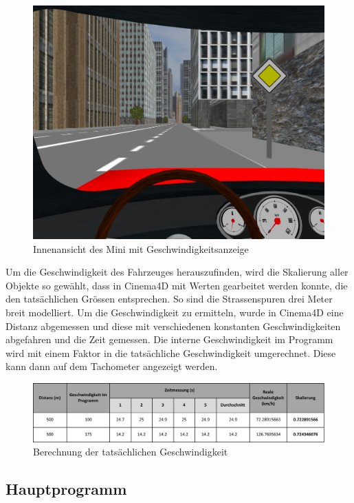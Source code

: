 \begin{figure}[H]
\centering 
\includegraphics[width=1\linewidth]{src/screenshot_cockpit.png}
\caption{Innenansicht des Mini mit Geschwindigkeitsanzeige} %
\label{screenshot_cockpit} %
\end{figure}
Um die Geschwindigkeit des Fahrzeuges herauszufinden, wird die Skalierung aller Objekte so gewählt, dass in Cinema4D mit Werten gearbeitet werden konnte, die den tatsächlichen Grössen entsprechen. So sind die Strassenspuren drei Meter breit modelliert. Um die Geschwindigkeit zu ermitteln, wurde in Cinema4D eine Distanz abgemessen und diese mit verschiedenen konstanten Geschwindigkeiten abgefahren und die Zeit gemessen. Die interne Geschwindigkeit im Programm wird mit einem Faktor in die tatsächliche Geschwindigkeit umgerechnet. Diese kann dann auf dem Tachometer angezeigt werden.\\
\begin{figure}[H]
\centering 
\includegraphics[width=1\linewidth]{src/geschwindigkeitsberechnung.pdf}
\caption{Berechnung der tatsächlichen Geschwindigkeit} %
\label{berechnung_geschwindigkeit} %
\end{figure}

\newpage
\subsection{Hauptprogramm}

